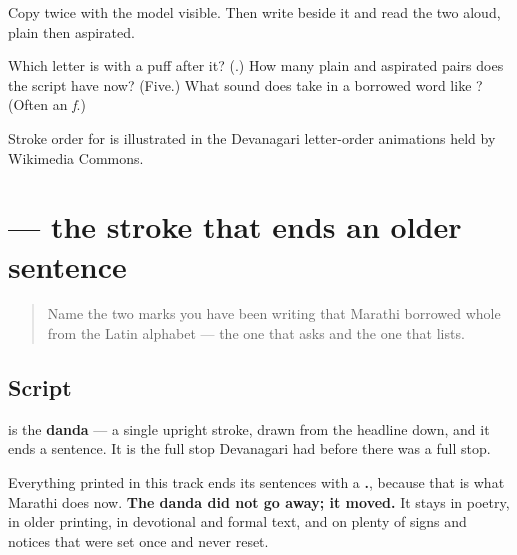 Copy \textbf{} twice with the model visible. Then write \textbf{} beside it and read the two aloud, plain then aspirated.

\begin{tcolorbox}[breakable,colback=teal!4,colframe=teal!35!black,title={Before you move on}]
Which letter is \textbf{} with a puff after it? (\textbf{}.) How many plain and aspirated pairs does the script have now? (Five.) What sound does \textbf{} take in a borrowed word like \textbf{}? (Often an \emph{f}.)

Stroke order for \textbf{} is illustrated in the Devanagari letter-order animations held by Wikimedia Commons.
\end{tcolorbox}
\section[\texorpdfstring{\mr{।} (danda)}{। (danda)}]{ — the stroke that ends an older sentence}

\label{lesson:MR-W64-danda}



\begin{quote}
Name the two marks you have been writing that Marathi borrowed whole from the Latin alphabet — the one that asks and the one that lists.
\end{quote}

\subsection*{Script}
\begin{quote}
\end{quote}

\textbf{} is the \textbf{danda} — a single upright stroke, drawn from the headline down, and it ends a sentence. It is the full stop Devanagari had before there was a full stop.

Everything printed in this track ends its sentences with a \textbf{.}, because that is what Marathi does now. \textbf{The danda did not go away; it moved.} It stays in poetry, in older printing, in devotional and formal text, and on plenty of signs and notices that were set once and never reset.

